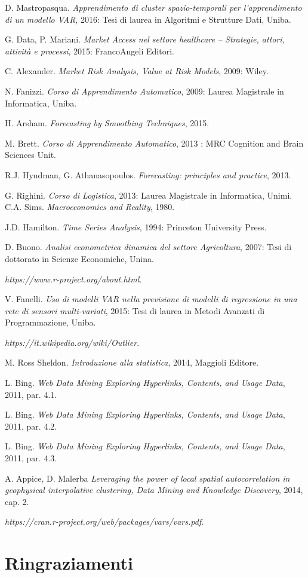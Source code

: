 \documentclass[12pt,a4paper,oneside,openright]{book}
\begin{document}
  \begin{thebibliography}{1}
   D. Mastropasqua. {\em Apprendimento di cluster spazio-temporali per l'apprendimento di un modello VAR}, 2016: Tesi di laurea in Algoritmi e Strutture Dati, Uniba.

   G. Data, P. Mariani. {\em Market Access nel settore healthcare – Strategie, attori, attività e processi}, 2015:  FrancoAngeli Editori.

   C. Alexander. {\em Market Risk Analysis, Value at Risk Models}, 2009: Wiley.

   N. Fanizzi. {\em Corso di Apprendimento Automatico}, 2009: Laurea Magistrale in Informatica, Uniba.
  
   H. Arsham. {\em Forecasting by Smoothing Techniques}, 2015.
  
   M. Brett. {\em Corso di Apprendimento Automatico}, 2013 : MRC Cognition and Brain Sciences Unit.
  
     R.J. Hyndman, G. Athanasopoulos. {\em Forecasting: principles and practice}, 2013.
    
     G. Righini. {\em Corso di Logistica}, 2013: Laurea Magistrale in Informatica, Unimi.
     C.A. Sims. {\em Macroeconomics and Reality}, 1980.
    
     J.D. Hamilton. {\em Time Series Analysis}, 1994: Princeton University Press.
   
     D. Buono. {\em Analisi econometrica dinamica del settore Agricoltura}, 2007: Tesi di dottorato in Scienze Economiche, Unina.
    
     {\em https://www.r-project.org/about.html}.
    
     V. Fanelli. {\em Uso di modelli VAR nella previsione di modelli di regressione in una rete di sensori multi-variati}, 2015: Tesi di laurea in Metodi Avanzati di Programmazione, Uniba.
    
      {\em https://it.wikipedia.org/wiki/Outlier}.
     
      M. Ross Sheldon. {\em Introduzione alla statistica}, 2014, Maggioli Editore.
      
      L. Bing. {\em Web Data Mining Exploring Hyperlinks, Contents, and Usage Data}, 2011, par. 4.1.
     
      L. Bing. {\em Web Data Mining Exploring Hyperlinks, Contents, and Usage Data}, 2011, par. 4.2.
     
      L. Bing. {\em Web Data Mining Exploring Hyperlinks, Contents, and Usage Data}, 2011, par. 4.3.
     
       A. Appice, D. Malerba {\em Leveraging the power of local spatial autocorrelation in geophysical interpolative clustering, Data Mining and Knowledge Discovery}, 2014, cap. 2.
          
      {\em https://cran.r-project.org/web/packages/vars/vars.pdf}.
      
  \end{thebibliography}
\chapter*{Ringraziamenti}
\end{document}
